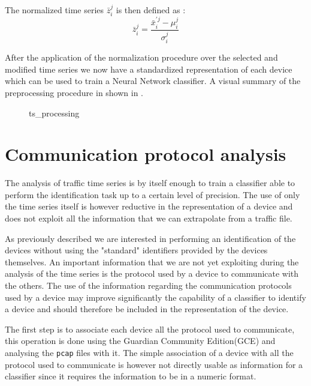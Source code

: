The normalized time series $\bar{z}^{j}_i$ is then defined as :
\begin{equation}
    \bar{z}^{j}_i = \frac{\bar{x}^{\prime j}_i - \mu_i^j}{\sigma_i^j}
\end{equation}

After the application of the normalization procedure over the selected and modified time series we now have a standardized representation of each device which can be used to train a Neural Network classifier. A visual summary of the preprocessing procedure in shown in .

\begin{figure}
    \centering

%
\caption{ts\_processing}
    \label{fig:ts_processing}
\end{figure}

\section{Communication protocol analysis}

The analysis of traffic time series is by itself enough to train a classifier able to perform the identification task up to a certain level of precision. The use of only the time series itself is however reductive in the representation of a device and does not exploit all the information that we can extrapolate from a traffic file.

As previously described we are interested in performing an identification of the devices without using the "standard" identifiers provided by the devices themselves. An important information that we are not yet exploiting during the analysis of the time series is the protocol used by a device to communicate with the others.
The use of the information regarding the communication protocols used by a device may improve significantly the capability of a classifier to identify a device and should therefore be included in the representation of the device.

The first step is to associate each device all the protocol used to communicate, this operation is done using the Guardian Community Edition(GCE) and analysing the \texttt{pcap} files with it. The simple association of a device with all the protocol used to communicate is however not directly usable as information for a classifier since it requires the information to be in a numeric format.

